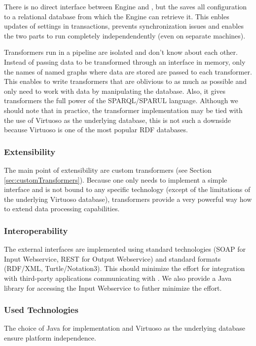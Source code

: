 There is no direct interface between Engine and \FE, but the \FE saves all configuration to a relational database from which the Engine can retrieve it. This enbles updates of settings in transactions, prevents synchronization issues and enables the two parts to run completely independendently (even on separate machines).

Transformers run in a pipeline are isolated and don't know about each other. Instead of passing data to be transformed through an interface in memory, only the names of named graphs where data are stored are passed to each transformer. This enables to write transformers that are oblivious to \odcs as much as possible and only need to work with data by manipulating the database. Also, it gives transformers the full power of the SPARQL/SPARUL language. Although we should note that in practice, the transformer implementation may be tied with the use of Virtuoso as the underlying database, this is not such a downside because Virtuoso is one of the most popular RDF databases.

\subsubsection{Extensibility}
The main point of extensibility are custom transformers (see Section \ref{sec:customTransformers}). Because one only needs to implement a simple interface and is not bound to any specific technology (except of the limitations of the underlying Virtuoso database), transformers provide a very powerful way how to extend data processing capabilities.

\subsubsection{Interoperability}
The external interfaces are implemented using standard technologies (SOAP for Input Webservice, REST for Output Webservice) and standard formats (RDF/XML, Turtle/Notation3). This should minimize the effort for integration with third-party applications communicating with \odcs. We also provide a Java library for accessing the Input Webservice to futher minimize the effort.

\subsubsection{Used Technologies}
The choice of Java for implementation and Virtuoso as the underlying database ensure platform independence.

